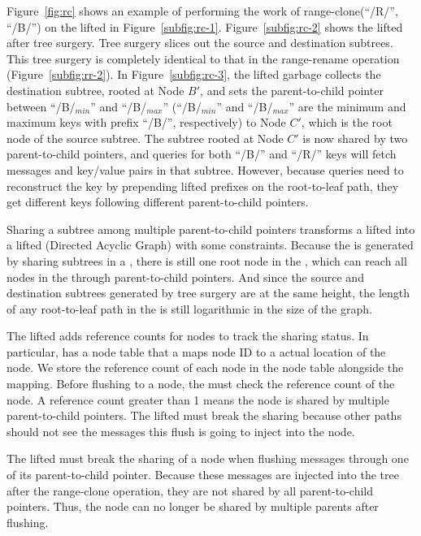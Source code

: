 Figure~\ref{fig:rc} shows an example of performing the work of
range-clone(``/R/'', ``/B/'') on the lifted \bet in Figure~\ref{subfig:rc-1}.
Figure~\ref{subfig:rc-2} shows the lifted \bet after tree surgery.
Tree surgery slices out the source and destination subtrees.
This tree surgery is completely identical to that in the range-rename operation
(Figure~\ref{subfig:rr-2}).
In Figure~\ref{subfig:rc-3}, the lifted \bet garbage collects the destination
subtree, rooted at Node $B'$, and sets the parent-to-child pointer between
``/B/$_{min}$'' and ``/B/$_{max}$''
(``/B/$_{min}$'' and ``/B/$_{max}$'' are the minimum and maximum keys with
prefix ``/B/'', respectively)
to Node $C'$,
which is the root node of the source subtree.
The subtree rooted at Node $C'$ is now shared by two parent-to-child pointers,
and queries for
both ``/B/'' and ``/R/'' keys will fetch messages and key/value pairs in that
subtree.
However, because queries need to reconstruct the key by prepending lifted
prefixes on the root-to-leaf path, they get different keys following different
parent-to-child pointers.

Sharing a subtree among multiple parent-to-child pointers transforms a lifted
\bet into a lifted \bedag (Directed Acyclic Graph) with some constraints.
Because the \bedag is generated by sharing subtrees in a \bet,
there is still one root node in the \bedag,
which can reach all nodes in the \bedag through parent-to-child pointers.
And since the source and destination subtrees generated by tree surgery are at
the same height, the length of any root-to-leaf path in the \bedag is still
logarithmic in the size of the graph.

The lifted \bedag adds reference counts for \bet nodes to track the sharing
status.
In particular, \fti has a node table that a maps node ID to a actual location of
the node.
We store the reference count of each node in the node table alongside
the mapping.
Before flushing to a node, the \bedag must check the reference count of the node.
A reference count greater than 1 means the node is shared by multiple
parent-to-child pointers.
The lifted \bedag must break the sharing because other paths should not see the
messages this flush is going to inject into the node.

The lifted \bedag must break the sharing of a node when flushing messages
through one of its parent-to-child pointer.
Because these messages are injected into the tree after the range-clone
operation, they are not shared by all parent-to-child pointers.
Thus, the node can no longer be shared by multiple parents after flushing.

